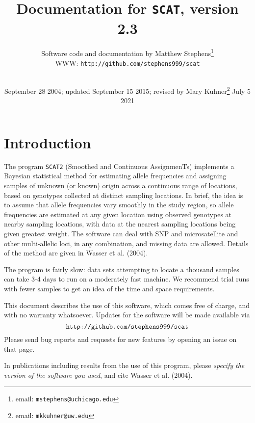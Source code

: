 \documentclass[10pt,titlepage,times,letterpaper]{article}
\def\SCAT{{\tt SCAT2} }
\begin{document}
\title{Documentation for {\tt SCAT}, version 2.3}

\author{
Software code and documentation by Matthew Stephens\footnote{email: {\tt mstephens@uchicago.edu}} \\
WWW: {\tt http://github.com/stephens999/scat}\\
\\
}

\date{September 28 2004; updated September 15 2015; revised by Mary Kuhner\footnote{email:  {\tt mkkuhner@uw.edu}} July 5 2021}


\maketitle

\tableofcontents
\vfil\eject
\section{Introduction}

The program \SCAT (Smoothed and Continuous AssignmenTs)
implements a Bayesian statistical method for estimating allele
frequencies and assigning samples of unknown (or known) origin across
a continuous range of locations, based on genotypes collected at
distinct sampling locations.  In brief, the idea is to assume that allele
frequencies vary smoothly in the study region, so allele frequencies
are estimated at any given location using observed genotypes at
nearby sampling locations, with data at the nearest sampling
locations being given greatest weight.  The software can deal with SNP
and microsatellite and other multi-allelic loci, in any combination,
and missing data are allowed. Details of the method are given in
Wasser et al. (2004).

The program is fairly slow:  data sets attempting to locate a thousand
samples can take 3-4 days to run on a moderately fast machine.  We
recommend trial runs with fewer samples to get an idea of the time and
space requirements.

This document describes the use of this software, which comes free of
charge, and with no warranty whatsoever.  Updates for the software
will be made available via
$$\text{{\tt http://github.com/stephens999/scat}}$$
Please send bug reports and requests for new features by opening an issue on that page.

In publications including results from the use of this program, please
{\it specify the version of the software you used}, and cite
Wasser et al. (2004).
\end{document}
